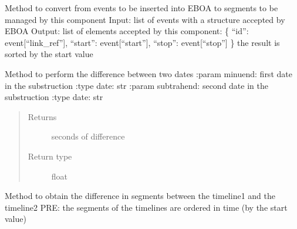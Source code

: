 \begin{fulllineitems}
\label{\detokenize{eboa.ingestion:eboa.ingestion.functions.convert_input_events_to_date_segments}}
Method to convert from events to be inserted into EBOA to segments to be managed by this component
Input: list of events with a structure accepted by EBOA
Output: list of elements accepted by this component:
\{
“id”: event{[}“link\_ref”{]},
“start”: event{[}“start”{]},
“stop”: event{[}“stop”{]}
\}
the result is sorted by the start value

\end{fulllineitems}


\begin{fulllineitems}
\label{\detokenize{eboa.ingestion:eboa.ingestion.functions.dates_difference}}
Method to perform the difference between two dates
:param minuend: first date in the substruction
:type date: str
:param subtrahend: second date in the substruction
:type date: str
\begin{quote}\begin{description}
\item[{Returns}] \leavevmode
seconds of difference

\item[{Return type}] \leavevmode
float

\end{description}\end{quote}

\end{fulllineitems}


\begin{fulllineitems}
\label{\detokenize{eboa.ingestion:eboa.ingestion.functions.difference_timelines}}
Method to obtain the difference in segments between the timeline1 and the timeline2
PRE: the segments of the timelines are ordered in time (by the start value)

\end{fulllineitems}

